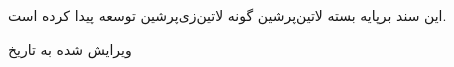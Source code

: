 \thispagestyle{plain}
\vspace*{\fill}
\begin{center}
این سند برپایه بسته ‌لاتین{‌پرشین} گونه ‌لاتین{‌زی‌پرشین} توسعه پیدا کرده است.

ویرایش شده به تاریخ 
\end{center}
